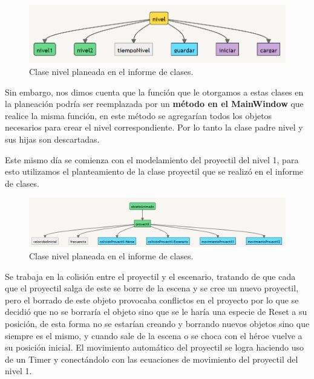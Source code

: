 \documentclass{article}
\begin{document}
\newpage
\begin{figure}[h]
\includegraphics[scale=0.6]{Images/niveles.png}
\centering
\caption{Clase nivel planeada en el informe de clases.}
\label{fig:niveles}
\end{figure}

Sin embargo, nos dimos cuenta que la función que le otorgamos a estas clases en la planeación podría ser reemplazada por un \textbf{método en el MainWindow} que realice la misma función, en este método se agregarían todos los objetos necesarios para crear el nivel correspondiente. Por lo tanto la clase padre nivel y sus hijas son descartadas.

Este mismo día se comienza con el modelamiento del proyectil del nivel 1, para esto utilizamos el planteamiento de la clase proyectil que se realizó en el informe de clases.

\begin{figure}[h]
\includegraphics[scale=0.5]{Images/proyectil.png}
\centering
\caption{Clase nivel planeada en el informe de clases.}
\label{fig:proyectil}
\end{figure}

Se trabaja en la colisión entre el proyectil y el escenario, tratando de que cada que el proyectil salga de este se borre de la escena y se cree un nuevo proyectil, pero el borrado de este objeto provocaba conflictos en el proyecto por lo que se decidió que no se borraría el objeto sino que se le haría una especie de Reset a su posición, de esta forma no se estarían creando y borrando nuevos objetos sino que siempre es el mismo, y cuando sale de la escena o se choca con el héroe vuelve a su posición inicial.
El movimiento automático del proyectil se logra haciendo uso de un Timer y conectándolo con las ecuaciones de movimiento del proyectil del nivel 1.
\end{document}
